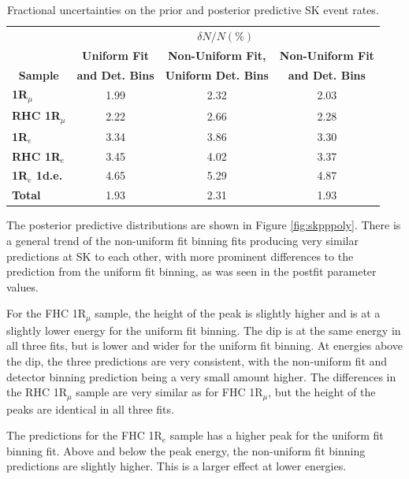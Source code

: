 \begin{center}
\begin{table}[!htbp]
\center
\begin{tabular}{l||c c c}
\hline \hline
& \multicolumn{3}{c}{$\delta N/N (\%)$}\\
& \multicolumn{1}{c}{\textbf{Uniform Fit}} & \multicolumn{1}{c}{\textbf{Non-Uniform Fit,}} & \multicolumn{1}{c}{\textbf{Non-Uniform Fit}}\\
\multicolumn{1}{c||}{\textbf{Sample}} & \multicolumn{1}{c}{\textbf{and Det. Bins}} & \multicolumn{1}{c}{\textbf{Uniform Det. Bins}} & \multicolumn{1}{c}{\textbf{and Det. Bins}}\\
\hline\hline
\textbf{1R$_{\mu}$} & 1.99 & 2.32 & 2.03\\
\textbf{RHC 1R$_{\mu}$} & 2.22 & 2.66 & 2.28 \\ 
\textbf{1R$_{e}$} & 3.34 & 3.86 & 3.30\\
\textbf{RHC 1R$_{e}$} & 3.45 & 4.02 & 3.37\\
\textbf{1R$_{e}$ 1d.e.} & 4.65 & 5.29 & 4.87\\ \hline
\textbf{Total} & 1.93 & 2.31 & 1.93\\ \hline\hline
\end{tabular}
\caption{Fractional uncertainties on the prior and posterior predictive SK event rates.}
\label{tab:SKerr}
\end{table}
\end{center}

The posterior predictive distributions are shown in Figure \ref{fig:skpppoly}. There is a general trend of the non-uniform fit binning fits producing very similar predictions at SK to each other, with more prominent differences to the prediction from the uniform fit binning, as was seen in the postfit parameter values.

For the FHC 1R$_{\mu}$ sample, the height of the peak is slightly higher and is at a slightly lower energy for the uniform fit binning. The dip is at the same energy in all three fits, but is lower and wider for the uniform fit binning. At energies above the dip, the three predictions are very consistent, with the non-uniform fit and detector binning prediction being a very small amount higher. The differences in the RHC 1R$_{\mu}$ sample are very similar as for FHC 1R$_{\mu}$, but the height of the peaks are identical in all three fits.

The predictions for the FHC 1R$_e$ sample has a higher peak for the uniform fit binning fit. Above and below the peak energy, the non-uniform fit binning predictions are slightly higher. This is a larger effect at lower energies.

